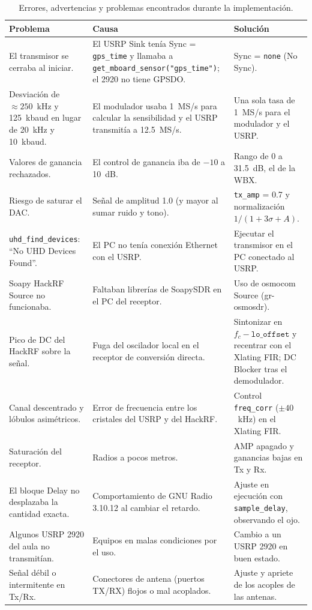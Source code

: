 \documentclass[conference]{IEEEtran}
\begin{document}
\begin{table}[!t]
\centering
\caption{Errores, advertencias y problemas encontrados durante la implementación.}
\label{tab:err}
\begin{tabular}{>{\raggedright}p{4.2cm}>{\raggedright}p{6.2cm}p{6.2cm}}
\toprule
Problema & Causa & Solución \\
\midrule
El transmisor se cerraba al iniciar. & El USRP Sink tenía Sync = \texttt{gps\_time} y llamaba a \texttt{get\_mboard\_sensor("gps\_time")}; el 2920 no tiene GPSDO. & Sync = \texttt{none} (No Sync). \\
Desviación de $\approx 250$~kHz y 125~kbaud en lugar de 20~kHz y 10~kbaud. & El modulador usaba 1~MS/s para calcular la sensibilidad y el USRP transmitía a 12.5~MS/s. & Una sola tasa de 1~MS/s para el modulador y el USRP. \\
Valores de ganancia rechazados. & El control de ganancia iba de $-10$ a 10~dB. & Rango de 0 a 31.5~dB, el de la WBX. \\
Riesgo de saturar el DAC. & Señal de amplitud 1.0 (y mayor al sumar ruido y tono). & \texttt{tx\_amp} = 0.7 y normalización $1/(1+3\sigma+A)$. \\
\texttt{uhd\_find\_devices}: ``No UHD Devices Found''. & El PC no tenía conexión Ethernet con el USRP. & Ejecutar el transmisor en el PC conectado al USRP. \\
Soapy HackRF Source no funcionaba. & Faltaban librerías de SoapySDR en el PC del receptor. & Uso de osmocom Source (gr-osmosdr). \\
Pico de DC del HackRF sobre la señal. & Fuga del oscilador local en el receptor de conversión directa. & Sintonizar en $f_c - \texttt{lo\_offset}$ y recentrar con el Xlating FIR; DC Blocker tras el demodulador. \\
Canal descentrado y lóbulos asimétricos. & Error de frecuencia entre los cristales del USRP y del HackRF. & Control \texttt{freq\_corr} ($\pm 40$~kHz) en el Xlating FIR. \\
Saturación del receptor. & Radios a pocos metros. & AMP apagado y ganancias bajas en Tx y Rx. \\
El bloque Delay no desplazaba la cantidad exacta. & Comportamiento de GNU Radio 3.10.12 al cambiar el retardo. & Ajuste en ejecución con \texttt{sample\_delay}, observando el ojo. \\
Algunos USRP 2920 del aula no transmitían. & Equipos en malas condiciones por el uso. & Cambio a un USRP 2920 en buen estado. \\
Señal débil o intermitente en Tx/Rx. & Conectores de antena (puertos TX/RX) flojos o mal acoplados. & Ajuste y apriete de los acoples de las antenas. \\
\bottomrule
\end{tabular}
\end{table}
\end{document}
